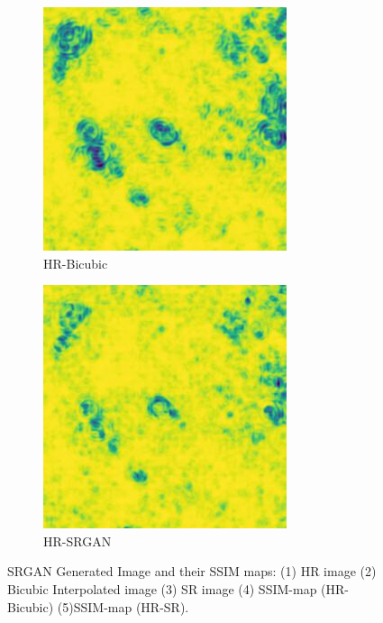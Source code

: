 \begin{figure}[H]
  \begin{subfigure}[b]{0.275\textwidth}
    \includegraphics[width=\textwidth]{Chapter7/SSIM_bicubic_9.jpg}
    \caption{HR-Bicubic}
  \end{subfigure}
  \begin{subfigure}[b]{0.275\textwidth}
    \includegraphics[width=\textwidth]{Chapter7/SSIM_srgan_9.jpg}
    \caption{HR-SRGAN}
  \end{subfigure}
    \caption{SRGAN Generated Image and their SSIM maps: (1) HR image (2) Bicubic Interpolated image (3) SR image (4)  SSIM-map (HR-Bicubic) (5)SSIM-map (HR-SR).\cite{DenseNET} \cite{SSIM}}
    \label{fig:label5.2}
\end{figure}


